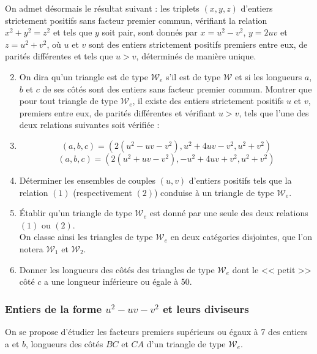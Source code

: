 \documentclass[landscape,twocolumn,leqno,a4paper,10pt]{report} %
\newcommand\n{\noindent}
\begin{document}
\n On admet désormais le résultat suivant : les triplets $(x, y, z)$ d'entiers strictement positifs sans facteur premier commun, vérifiant la relation $x^{2}+y^{2}=z^{2}$ et tels que $y$ soit pair, sont donnés par $x=u^{2}-v^{2}$, $y=2 u v$ et $z=u^{2}+v^{2}$, où $u$ et $v$ sont des entiers strictement positifs premiers entre eux, de parités différentes et tels que $u>v$, déterminés de manière unique.

\begin{enumerate}\setcounter{enumi}{1}
	\item On dira qu'un triangle est de type $\mathscr{W}_{e}$ s'il est de type $\mathscr{W}$ et si les longueurs $a$, $b$ et $c$ de ses côtés sont des entiers sans facteur premier commun. Montrer que pour tout triangle de type $\mathscr{W}_{e}$, il existe des entiers strictement positifs $u$ et $v$, premiers entre eux, de parités différentes et vérifiant $u>v$, tels que l'une des deux relations suivantes soit vérifiée :
	\item \begin{equation}\tag{$1$}
	(a, b, c)=\left(2\left(u^{2}-u v-v^{2}\right), u^{2}+4 u v-v^{2}, u^{2}+v^{2}\right)
	\end{equation}
	\begin{equation}\tag{$2$}
	(a, b, c)=\left(2\left(u^{2}+u v-v^{2}\right),-u^{2}+4 u v+v^{2}, u^{2}+v^{2}\right)
	\end{equation}
	\item Déterminer les ensembles de couples $(u, v)$ d'entiers positifs tels que la relation $(1)$ (respectivement $(2)$) conduise à un triangle de type $\mathscr{W}_{e}$.
	\item Établir qu'un triangle de type $\mathscr{W}_{e}$ est donné par une seule des deux relations $(1)$ ou $(2)$.\\
	On classe ainsi les triangles de type $\mathscr{W}_{e}$ en deux catégories disjointes, que l'on notera $\mathscr{W}_{1}$ et $\mathscr{W}_{2}$.
	\item Donner les longueurs des côtés des triangles de type $\mathscr{W}_{e}$ dont le << petit >> côté $c$ a une longueur inférieure ou égale à 50.
\end{enumerate}


\subsubsection{Entiers de la forme $u^{2}-u v-v^{2}$ et leurs diviseurs}

\n On se propose d'étudier les facteurs premiers supérieurs ou égaux à 7 des entiers a et $b$, longueurs des côtés $B C$ et $C A$ d'un triangle de type $\mathscr{W}_{e}$.
\end{document}
